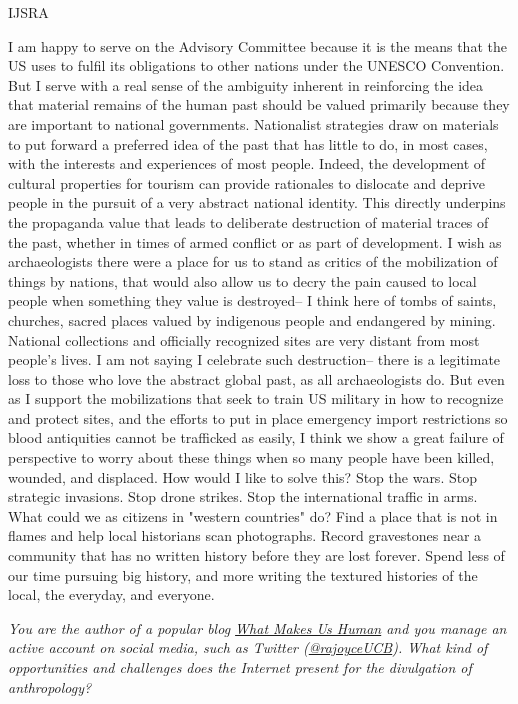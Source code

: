 \begin{labeling}{IJSRA}
\item[RAJ] I am happy to serve on the Advisory Committee because it is the means that the US uses to fulfil its obligations to other nations under the UNESCO Convention. But I serve with a real sense of the ambiguity inherent in reinforcing the idea that material remains of the human past should be valued primarily because they are important to national governments. Nationalist strategies draw on materials to put forward a preferred idea of the past that has little to do, in most cases, with the interests and experiences of most people. Indeed, the development of cultural properties for tourism can provide rationales to dislocate and deprive people in the pursuit of a very abstract national identity. This directly underpins the propaganda value that leads to deliberate destruction of material traces of the past, whether in times of armed conflict or as part of development. I wish as archaeologists there were a place for us to stand as critics of the mobilization of things by nations, that would also allow us to decry the pain caused to local people when something they value is destroyed-- I think here of tombs of saints, churches, sacred places valued by indigenous people and endangered by mining. National collections and officially recognized sites are very distant from most people's lives. I am not saying I celebrate such destruction-- there is a legitimate loss to those who love the abstract global past, as all archaeologists do. But even as I support the mobilizations that seek to train US military in how to recognize and protect sites, and the efforts to put in place emergency import restrictions so blood antiquities cannot be trafficked as easily, I think we show a great failure of perspective to worry about these things when so many people have been killed, wounded, and displaced. How would I like to solve this? Stop the wars. Stop strategic invasions. Stop drone strikes. Stop the international traffic in arms. What could we as citizens in "western countries" do? Find a place that is not in flames and help local historians scan photographs. Record gravestones near a community that has no written history before they are lost forever. Spend less of our time pursuing big history, and more writing the textured histories of the local, the everyday, and everyone.

\item[IJSRA] \emph{You are the author of a popular blog \href{https://www.psychologytoday.com/blog/what-makes-us-human}{What Makes Us Human} and you manage an active account on social media, such as Twitter (\href{https://twitter.com/rajoyceucb}{@rajoyceUCB}). What kind of opportunities and challenges does the Internet present for the divulgation of anthropology?}
	

\end{labeling}
